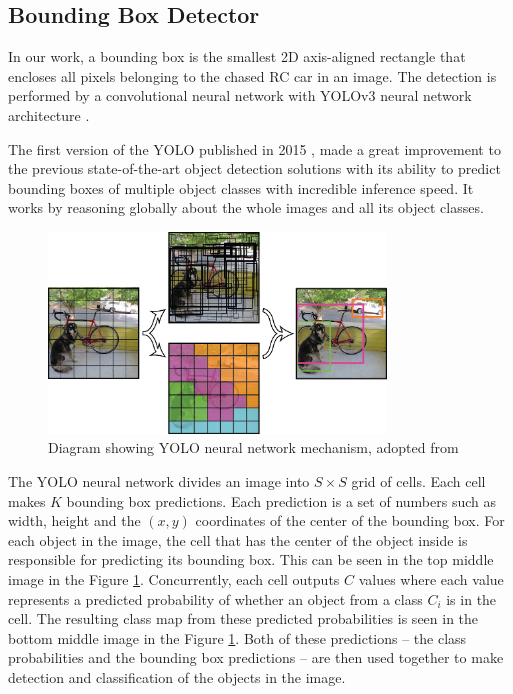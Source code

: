 \documentclass{ctuthesis/ctuthesis}
\begin{document}
\subsection{Bounding Box Detector}
In our work, a bounding box is the smallest 2D axis-aligned rectangle that encloses all pixels belonging to the chased RC car in an image. The detection is performed by a convolutional neural network \cite{CNN_Lecun} with YOLOv3 neural network architecture \cite{YOLOv3}. \par 
The first version of the YOLO published in 2015 \cite{YOLO}, made a great improvement to the previous state-of-the-art object detection solutions with its ability to predict bounding boxes of multiple object classes with incredible inference speed. It works by reasoning globally about the whole images and all its object classes. \par


\begin{figure}[h!]
    \centering
    \includegraphics[width=0.8\textwidth]{images/YOLO.png}
    
    \caption{Diagram showing YOLO neural network mechanism, adopted from \protect\cite{YOLO}}\label{f:YOLO}
\end{figure}

The YOLO neural network divides an image into $S\times S$ grid of cells. Each cell makes $K$ bounding box predictions. Each prediction is a set of numbers such as width, height and the $(x,y)$ coordinates of the center of the bounding box. For each object in the image, the cell that has the center of the object inside is responsible for predicting its bounding box. This can be seen in the top middle image in the Figure \ref{f:YOLO}. Concurrently, each cell outputs $C$ values where each value represents a predicted probability of whether an object from a class $C_i$ is in the cell. The resulting class map from these predicted probabilities is seen in the bottom middle image in the Figure \ref{f:YOLO}. Both of these predictions -- the class probabilities and the bounding box predictions -- are then used together to make detection and classification of the objects in the image.
\par
\end{document}
